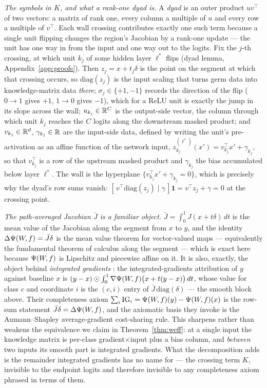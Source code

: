 \begin{clarifybox}
\emph{The symbols in $K$, and what a rank-one dyad is.} A \emph{dyad} is an
outer product $uv^{\top}$ of two vectors: a matrix of rank one, every column a
multiple of $u$ and every row a multiple of $v^{\top}$. Each wall crossing
contributes exactly one such term because a single unit flipping changes the
region's Jacobian by a rank-one update --- the unit has one way in from the
input and one way out to the logits. Fix the $j$-th crossing, at which unit
$k_j$ of some hidden layer $\ell^{*}$ flips (dyad lemma,
Appendix~\ref{app:proofs}). Then $z_j=x+t_j\delta$ is the point on the segment
at which that crossing occurs, so $\mathrm{diag}(z_j)$ is the input scaling
that turns germ data into knowledge-matrix data \emph{there};
$\sigma_j\in\{+1,-1\}$ records the direction of the flip ($0\to1$ gives $+1$,
$1\to0$ gives $-1$), which for a ReLU unit is exactly the jump in its slope
across the wall; $u_{k_j}\in\mathbb{R}^{C}$ is the output-side vector, the column
through which unit $k_j$ reaches the $C$ logits along the downstream masked
product; and $v_{k_j}\in\mathbb{R}^{d}$, $\gamma_{k_j}\in\mathbb{R}$ are the input-side data,
defined by writing the unit's pre-activation as an affine function of the
network input, $z^{(\ell^{*})}_{k_j}(x')=v_{k_j}^{\top}x'+\gamma_{k_j}$, so
that $v_{k_j}^{\top}$ is a row of the upstream masked product and
$\gamma_{k_j}$ the bias accumulated below layer $\ell^{*}$. The wall is the
hyperplane $\{v_{k_j}^{\top}x'+\gamma_{k_j}=0\}$, which is precisely why the
dyad's row sums vanish: $[\,v^{\top}\mathrm{diag}(z_j)\mid\gamma\,]\mathbf 1
=v^{\top}z_j+\gamma=0$ at the crossing point.
\end{clarifybox}

\begin{clarifybox}
\emph{The path-averaged Jacobian $\bar J$ is a familiar object.}
$\bar J=\int_0^1J(x+t\delta)\,dt$ is the mean value of the Jacobian along the
segment from $x$ to $y$, and the identity $\Delta\Psi(W\!,f)=\bar J\delta$ is the mean
value theorem for vector-valued maps --- equivalently the fundamental theorem
of calculus along the segment --- which is exact here because $\Psi(W\!,f)$ is Lipschitz
and piecewise affine on it. It is also, exactly, the object behind
\emph{integrated gradients} \citep{sundararajan2017axiomatic}: the
integrated-gradients attribution of $y$ against baseline $x$ is
$(y-x)\odot\int_0^1\nabla\Psi(W\!,f)\bigl(x+t(y-x)\bigr)\,dt$, whose value for class
$c$ and coordinate $i$ is the $(c,i)$ entry of $\bar J\,\mathrm{diag}(\delta)$
--- the smooth block above. Their completeness axiom
$\sum_i\mathrm{IG}_i=\Psi(W\!,f)(y)-\Psi(W\!,f)(x)$ is the row-sum statement
$\bar J\delta=\Delta\Psi(W\!,f)$, and the axiomatic basis they invoke is the Aumann--Shapley
average-gradient cost-sharing rule. This sharpens rather than weakens the
equivalence we claim in Theorem~\ref{thm:weff}: at a single input the
knowledge matrix is per-class gradient$\times$input plus a bias column, and
\emph{between} two inputs its smooth part is integrated gradients. What the
decomposition adds is the remainder integrated gradients has no name for ---
the crossing term $K$, invisible to the endpoint logits and therefore
invisible to any completeness axiom phrased in terms of them.
\end{clarifybox}


